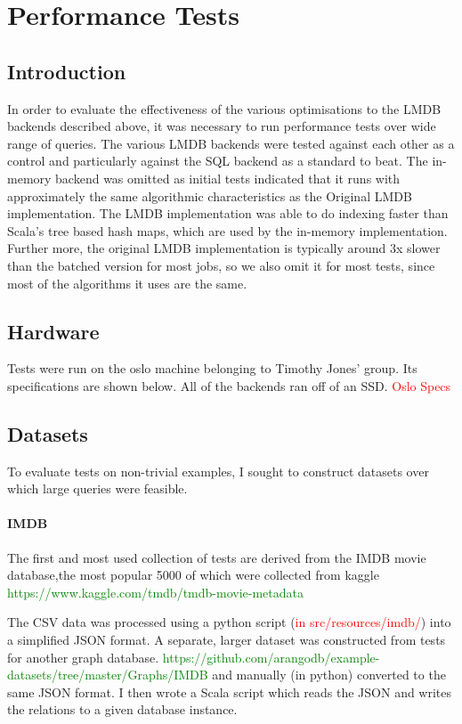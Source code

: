 \documentclass[12pt,a4paper,twoside,openright]{report}
\newcommand\todo[1]{\textcolor{red}{#1}}
\newcommand\toReference[1]{\textcolor{green}{#1}}
\begin{document}
{{\section{Performance Tests}
	\subsection{Introduction}
	In order to evaluate the effectiveness of the various optimisations to the LMDB backends described above, it was necessary to run performance tests over wide range of queries. The various LMDB backends were tested against each other as a control and particularly against the SQL backend as a standard to beat. The in-memory backend was omitted as initial tests indicated that it runs with approximately the same algorithmic characteristics as the Original LMDB implementation. The LMDB implementation was able to do indexing faster than Scala's tree based hash maps, which are used by the in-memory implementation. Further more, the original LMDB implementation is typically around 3x slower than the batched version for most jobs, so we also omit it for most tests, since most of the algorithms it uses are the same.
	\subsection{Hardware}
	Tests were run on the oslo machine belonging to Timothy Jones' group. Its specifications are shown below. All of the backends ran off of an SSD.
	\todo{Oslo Specs}
	\subsection{Datasets}
	To evaluate tests on non-trivial examples, I sought to construct datasets over which large queries were feasible.

		\paragraph{IMDB}
		The first and most used collection of tests are derived from the IMDB movie database,the most popular 5000 of which were collected from kaggle \toReference{https://www.kaggle.com/tmdb/tmdb-movie-metadata}

The CSV data was processed using a python script (\todo{in src/resources/imdb/}) into a simplified JSON format. A separate, larger dataset was constructed from tests for another graph database. \toReference{https://github.com/arangodb/example-datasets/tree/master/Graphs/IMDB} and manually (in python) converted to the same JSON format. I then wrote a Scala script which reads the JSON and writes the relations to a given database instance.

}}
\end{document}
